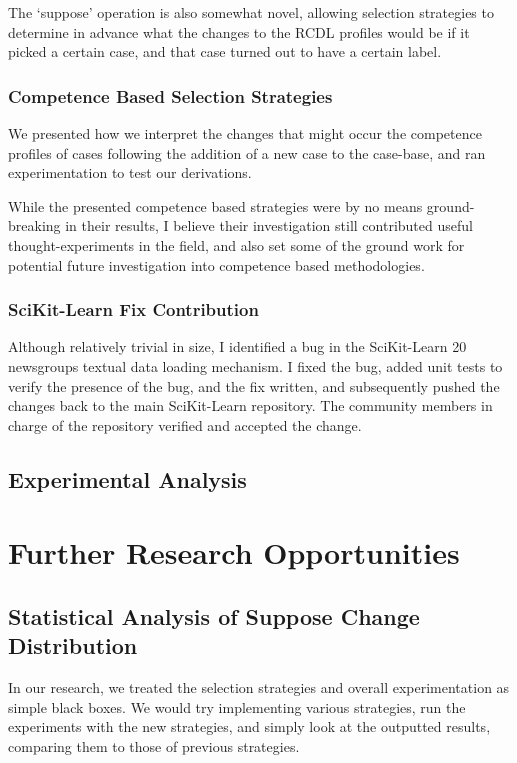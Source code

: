 \documentclass[a4paper,11pt]{report}
\begin{document}
The `suppose' operation is also somewhat novel, allowing selection strategies to determine in advance what the changes to the RCDL profiles would be if it picked a certain case, and that case turned out to have a certain label.

\subsubsection{Competence Based Selection Strategies}

We presented how we interpret the changes that might occur the competence profiles of cases following the addition of a new case to the case-base, and ran experimentation to test our derivations.

While the presented competence based strategies were by no means ground-breaking in their results, I believe their investigation still contributed useful thought-experiments in the field, and also set some of the ground work for potential future investigation into competence based methodologies.

\subsubsection{SciKit-Learn Fix Contribution}

Although relatively trivial in size, I identified a bug in the SciKit-Learn 20 newsgroups textual data loading mechanism. I fixed the bug, added unit tests to verify the presence of the bug, and the fix written, and subsequently pushed the changes back to the main SciKit-Learn repository. The community members in charge of the repository verified and accepted the change.

\subsection{Experimental Analysis}


\section{Further Research Opportunities}
\subsection{Statistical Analysis of Suppose Change Distribution}
In our research, we treated the selection strategies and overall experimentation as simple black boxes. We would try implementing various strategies, run the experiments with the new strategies, and simply look at the outputted results, comparing them to those of previous strategies.
\end{document}
